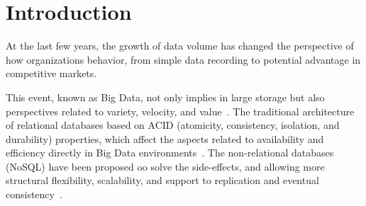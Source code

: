 \documentclass{svproc}
\begin{document}
\section{Introduction}
\label{sec:introducao}

At the last few years, the growth of data volume has changed the perspective of how organizations behavior, from simple data recording to potential advantage in competitive markets.

This event, known as Big Data, not only implies in large storage but also perspectives related to variety, velocity, and value~\cite{ward2013undefined}. The traditional architecture of relational databases based on ACID (atomicity, consistency, isolation, and durability) properties, which affect the aspects related to availability and efficiency directly in Big Data environments~\cite{aparicio:2016}. 
The non-relational databases (NoSQL) have been proposed oo solve the side-effects, and allowing more structural flexibility, scalability, and support to replication and eventual consistency~\cite{han2011survey}.
  
\end{document}
